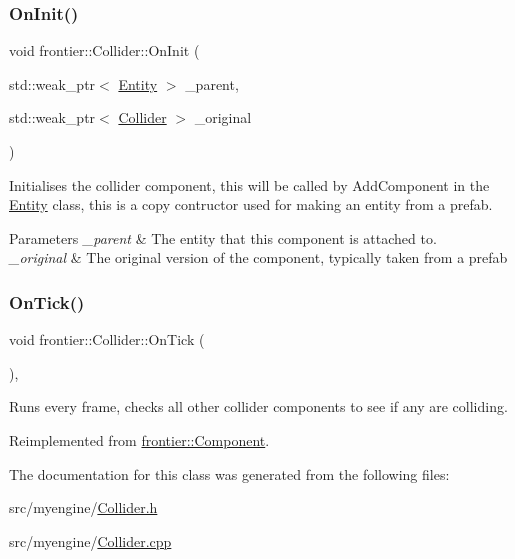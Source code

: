 \subsubsection{\texorpdfstring{On\+Init()}{OnInit()}\hspace{0.1cm}{\footnotesize\ttfamily [2/2]}}
{\footnotesize\ttfamily void frontier\+::\+Collider\+::\+On\+Init (\begin{DoxyParamCaption}\item[{std\+::weak\+\_\+ptr$<$ \hyperlink{classfrontier_1_1_entity}{Entity} $>$}]{\+\_\+parent,  }\item[{std\+::weak\+\_\+ptr$<$ \hyperlink{classfrontier_1_1_collider}{Collider} $>$}]{\+\_\+original }\end{DoxyParamCaption})}



Initialises the collider component, this will be called by Add\+Component in the \hyperlink{classfrontier_1_1_entity}{Entity} class, this is a copy contructor used for making an entity from a prefab. 


\begin{DoxyParams}{Parameters}
{\em \+\_\+parent} & The entity that this component is attached to. \\
\hline
{\em \+\_\+original} & The original version of the component, typically taken from a prefab \\
\hline
\end{DoxyParams}
\mbox{\label{classfrontier_1_1_collider_ac03782c94e8f7a2064ea1441cbd12c81}} 
\subsubsection{\texorpdfstring{On\+Tick()}{OnTick()}}
{\footnotesize\ttfamily void frontier\+::\+Collider\+::\+On\+Tick (\begin{DoxyParamCaption}{ }\end{DoxyParamCaption})\hspace{0.3cm}{\ttfamily [override]}, {\ttfamily [virtual]}}



Runs every frame, checks all other collider components to see if any are colliding. 



Reimplemented from \hyperlink{classfrontier_1_1_component_ab920f9bc07ce051ebb5559c5a66508d1}{frontier\+::\+Component}.



The documentation for this class was generated from the following files\+:\begin{DoxyCompactItemize}
\item 
src/myengine/\hyperlink{_collider_8h}{Collider.\+h}\item 
src/myengine/\hyperlink{_collider_8cpp}{Collider.\+cpp}\end{DoxyCompactItemize}
